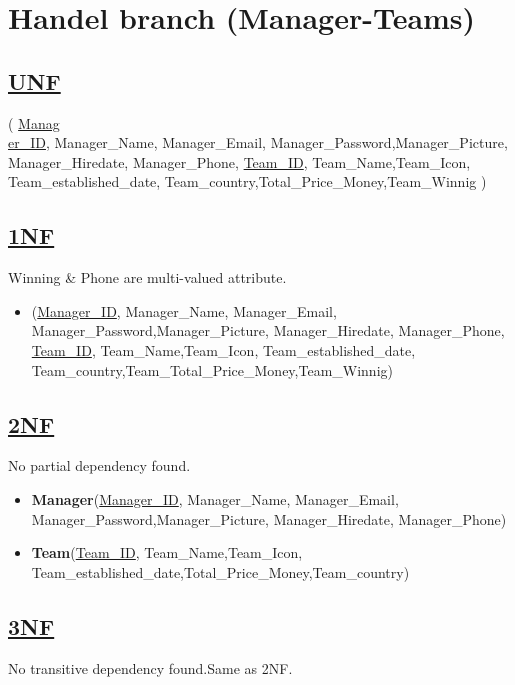 \section{\texorpdfstring{\centering Handel branch (Manager-Teams)}{Supervise branch (Manager-Teams)}}

\subsection*{\underline{UNF}}

(
\underline{Manag\\er\_ID}, Manager\_Name, Manager\_Email, Manager\_Password,Manager\_Picture, Manager\_Hiredate, Manager\_Phone,
\underline{Team\_ID}, Team\_Name,Team\_Icon, Team\_established\_date, Team\_country,Total\_Price\_Money,Team\_Winnig
)

\subsection*{\underline{1NF}}

Winning \& Phone are multi-valued attribute.
\vskip 0.2in
\begin{itemize}
    \item
          (\underline{Manager\_ID}, Manager\_Name, Manager\_Email, Manager\_Password,Manager\_Picture, Manager\_Hiredate, Manager\_Phone,
          \underline{Team\_ID}, Team\_Name,Team\_Icon, Team\_established\_date, Team\_country,Team\_Total\_Price\_Money,Team\_Winnig)
\end{itemize}

\subsection*{\underline{2NF}}
No partial dependency found.
\begin{itemize}
    \item \textbf{Manager}(\underline{Manager\_ID}, Manager\_Name, Manager\_Email, Manager\_Password,Manager\_Picture, Manager\_Hiredate, Manager\_Phone)
    \item \textbf{Team}(\underline{Team\_ID}, Team\_Name,Team\_Icon, Team\_established\_date,Total\_Price\_Money,Team\_country)
\end{itemize}

\subsection*{\underline{3NF}}
No transitive dependency found.Same as 2NF.

